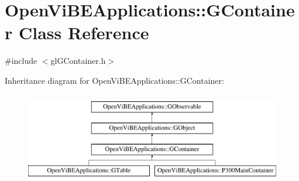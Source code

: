 \hypertarget{classOpenViBEApplications_1_1GContainer}{
\section{OpenViBEApplications::GContainer Class Reference}
\label{classOpenViBEApplications_1_1GContainer}
}


{\ttfamily \#include $<$glGContainer.h$>$}

Inheritance diagram for OpenViBEApplications::GContainer:\begin{figure}[H]
\begin{center}
\leavevmode
\includegraphics[height=4.000000cm]{classOpenViBEApplications_1_1GContainer}
\end{center}
\end{figure}
